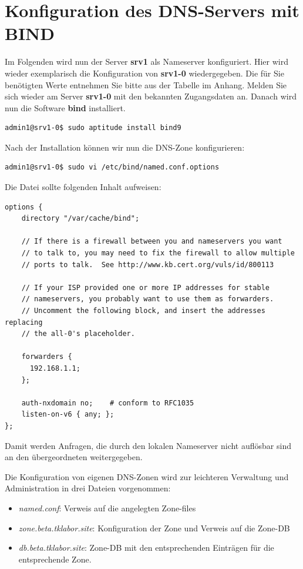 \section{Konfiguration des DNS-Servers mit BIND}
Im Folgenden wird nun der Server \textbf{srv1} als Nameserver konfiguriert. Hier
wird wieder exemplarisch die Konfiguration von \textbf{srv1-0} wiedergegeben.
Die für Sie benötigten Werte entnehmen Sie bitte aus der Tabelle im Anhang.
Melden Sie sich wieder am Server \textbf{srv1-0} mit den bekannten Zugangsdaten
an. Danach wird nun die Software \textbf{bind} installiert.

\begin{lstlisting}
admin1@srv1-0$ sudo aptitude install bind9
\end{lstlisting}

Nach der Installation können wir nun die DNS-Zone konfigurieren:
\begin{lstlisting}
admin1@srv1-0$ sudo vi /etc/bind/named.conf.options
\end{lstlisting}
Die Datei sollte folgenden Inhalt aufweisen:
\begin{scriptsize}
\begin{lstlisting}
options {
    directory "/var/cache/bind";

    // If there is a firewall between you and nameservers you want
    // to talk to, you may need to fix the firewall to allow multiple
    // ports to talk.  See http://www.kb.cert.org/vuls/id/800113
  
    // If your ISP provided one or more IP addresses for stable 
    // nameservers, you probably want to use them as forwarders.  
    // Uncomment the following block, and insert the addresses replacing
    // the all-0's placeholder.

    forwarders {
      192.168.1.1;
    };

    auth-nxdomain no;    # conform to RFC1035
    listen-on-v6 { any; };
};
\end{lstlisting}
\end{scriptsize}

Damit werden Anfragen, die durch den lokalen Nameserver nicht auflösbar sind an den übergeordneten weitergegeben.

Die Konfiguration von eigenen DNS-Zonen wird zur leichteren Verwaltung und
Administration in drei Dateien vorgenommen:
\begin{itemize}
  \item \textit{named.conf}: Verweis auf die angelegten Zone-files
  \item \textit{zone.beta.tklabor.site}: Konfiguration der Zone und Verweis auf
  die Zone-DB
  \item \textit{db.beta.tklabor.site}: Zone-DB mit den entsprechenden Einträgen
  für die entsprechende Zone.
\end{itemize}

